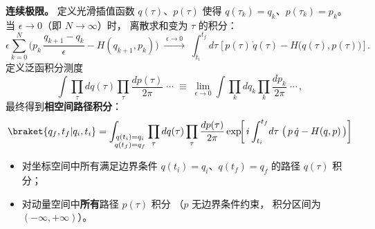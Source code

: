 \medskip\noindent
\textbf{连续极限。}
定义光滑插值函数 $q(\tau)$、$p(\tau)$
使得 $q(\tau_k)=q_k$、$p(\tau_k)=p_k$。
当 $\epsilon\to 0$（即 $N\to\infty$）时，
离散求和变为 $\tau$ 的积分：
\[
  \epsilon\sum_{k=0}^{N}\biggl(
    p_k\,\frac{q_{k+1}-q_k}{\epsilon}-H(q_{k+1},p_k)
  \biggr)
  \;\xrightarrow{\;\epsilon\to 0\;}
  \;\int_{t_i}^{t_f}\!d\tau\;
    \bigl[\,p(\tau)\,\dot{q}(\tau)-H\bigl(q(\tau),p(\tau)\bigr)\,\bigr]\,.
\]
定义泛函积分测度
\begin{equation}
  \int\prod_{\tau}dq(\tau)\prod_{\tau}\frac{dp(\tau)}{2\pi}\;\cdots
  \;\equiv\;
  \lim_{\epsilon\to 0}\int
    \prod_{k}dq_k\prod_{k}\frac{dp_k}{2\pi}\;\cdots\,,
\end{equation}
最终得到\textbf{相空间路径积分}：
\begin{equation}\label{eq:PI-phase-space}
  \braket{q_f,t_f|q_i,t_i}
  =\int_{\substack{q(t_i)=q_i\\q(t_f)=q_f}}
    \prod_{\tau}dq(\tau)\prod_{\tau}\frac{dp(\tau)}{2\pi}
    \exp\!\biggl[\,i\int_{t_i}^{t_f}\!d\tau\;
      \bigl(\,p\,\dot{q}-H(q,p)\,\bigr)
    \biggr]
\end{equation}
\begin{itemize}
  \item 对坐标空间中所有满足边界条件
    $q(t_i)=q_i$、$q(t_f)=q_f$ 的路径 $q(\tau)$ 积分；
  \item 对动量空间中\textbf{所有}路径 $p(\tau)$ 积分
    （$p$ 无边界条件约束，
    积分区间为 $(-\infty,+\infty)$）。
\end{itemize}

